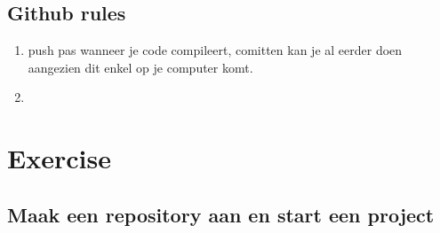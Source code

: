 \documentclass[a4paper, titlepage]{article}
\begin{document}
		\subsection{Github rules}
		\begin{enumerate}
			\item push pas wanneer je code compileert, comitten kan je al eerder doen aangezien dit enkel op je computer komt.
			\item 
		\end{enumerate}
		
		\pagebreak
	\section{Exercise}
		\subsection{Maak een repository aan en start een project}
\end{document}
